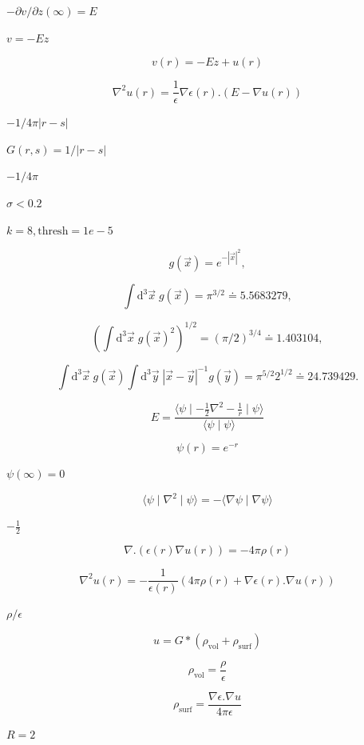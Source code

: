 \documentclass{article}
\begin{document}
$- \partial v / \partial z(\infty) = E$
\pagebreak

$v = - E z$
\pagebreak

\[
v(r) = - E z + u(r)
\]
\pagebreak

\[
   \nabla^2 u(r) = \frac{1}{\epsilon} \nabla \epsilon(r) .  \left(E - \nabla u(r) \right)
\]
\pagebreak

$-1 / 4 \pi |r-s|$
\pagebreak

$G(r,s) = 1/|r-s|$
\pagebreak

$-1/4\pi$
\pagebreak

$\sigma<0.2$
\pagebreak

$k=8, \mbox{thresh}=1e-5$
\pagebreak

\[ g(\vec{x}) = e^{-|\vec{x}|^2}, \]
\pagebreak

\[
   \int \mathrm{d}^3 \vec{x} \; g(\vec{x}) = \pi^{3/2} \doteq 5.5683279,
\]
\pagebreak

\[
   \left( \int \mathrm{d}^3 \vec{x} \; g(\vec{x})^2 \right)^{1/2} = (\pi/2)^{3/4} \doteq 1.403104,
\]
\pagebreak

\[
   \int \mathrm{d}^3 \vec{x} \; g(\vec{x}) \int \mathrm{d}^3 \vec{y} \; |\vec{x}-\vec{y}|^{-1} g(\vec{y}) = \pi^{5/2} 2^{1/2} \doteq 24.739429.
\]
\pagebreak

\[
    E = \frac{\langle \psi \mid - \frac{1}{2}  \nabla^2  - \frac{1}{r} \mid \psi \rangle}{\langle \psi \mid \psi \rangle}
\]
\pagebreak

\[
   \psi(r) = e^{-r}
\]
\pagebreak

$ \psi(\infty)=0 $
\pagebreak

\[
     \langle \psi \mid \nabla^2 \mid \psi \rangle = - \langle \nabla \psi \mid \nabla \psi \rangle
\]
\pagebreak

$-\frac{1}{2}$
\pagebreak

\[
\nabla . \left( \epsilon(r) \nabla u(r)  \right) = - 4 \pi \rho(r)
\]
\pagebreak

\[
   \nabla^2 u(r) = - \frac{1}{\epsilon(r)} \left( 4 \pi \rho(r) + \nabla \epsilon(r) .  \nabla u(r) \right)
\]
\pagebreak

$\rho / \epsilon$
\pagebreak

\[
   u = G * \left(\rho_{\mbox{vol}} + \rho_{\mbox{surf}} \right)
\]
\pagebreak

\[
   \rho_{\mbox{vol}} = \frac{\rho}{\epsilon}
\]
\pagebreak

\[
   \rho_{\mbox{surf}} = \frac{\nabla \epsilon .  \nabla u}{4 \pi \epsilon}
\]
\pagebreak

$R=2$
\pagebreak
\end{document}
